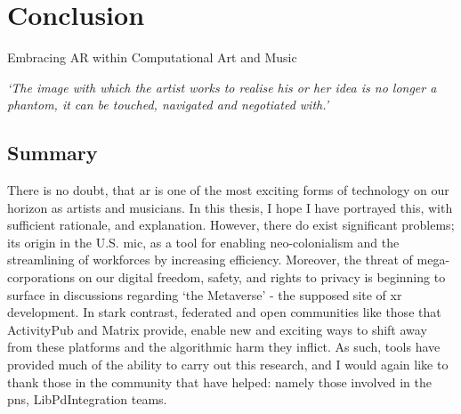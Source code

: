 \chapter{Conclusion}{Embracing AR within Computational Art and Music}
\label{sec: conclusion}
\epigraph{\textit{`The image with which the artist works to realise his or her idea is no longer a phantom, it can be touched, navigated and negotiated with.'}}{\citep[p.5]{ryan1991}}


\clearpage

\section{Summary}\label{sec: conclusion-summary}
There is no doubt, that \gls{ar} is one of the most exciting forms of technology on our horizon as artists and musicians. In this thesis, I hope I have portrayed this, with sufficient rationale, and explanation. However, there do exist significant problems; its origin in the U.S. \gls{mic}, as a tool for enabling neo-colonialism and the streamlining of workforces by increasing efficiency. Moreover, the threat of mega-corporations on our digital freedom, safety, and rights to privacy is beginning to surface in discussions regarding `the Metaverse' - the supposed site of \gls{xr} development. In stark contrast, federated and open communities like those that ActivityPub and Matrix provide, enable new and exciting ways to shift away from these platforms and the algorithmic harm they inflict. As such,  tools have provided much of the ability to carry out this research, and I would again like to thank those in the community that have helped: namely those involved in the \gls{pns}, LibPdIntegration teams.


